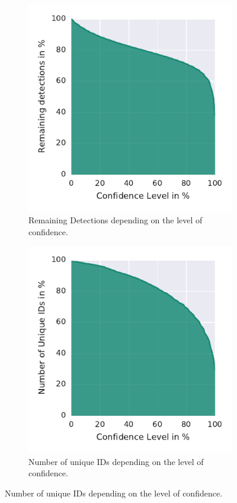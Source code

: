 \begin{figure}
    \centering
    \begin{subfigure}[b]{0.45\textwidth}
        \includegraphics[width=\textwidth]{Figures/confVSamount}
        \caption[Remaining Detections]{Remaining Detections depending on the level of confidence.}
        \label{fig:confVSamount}
    \end{subfigure}
    \begin{subfigure}[b]{0.45\textwidth}
        \includegraphics[width=\textwidth]{Figures/confVSids}
        \caption[Unique IDs]{Number of unique IDs depending on the level of confidence.}
        \label{fig:confVSids}
    \end{subfigure}


\end{figure}
